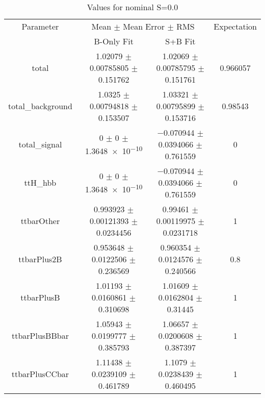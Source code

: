 \begin{table}
\centering
\caption{Values for nominal S=0.0}
\begin{tabular}{cccc}
\toprule
Parameter & \multicolumn{2}{c}{Mean $\pm$ Mean Error $\pm$ RMS} & Expectation\\
 & B-Only Fit & S+B Fit & \\
\midrule
total & \num{1.02079} $\pm$ \num{0.00785805} $\pm$ \num{0.151762} & \num{1.02069} $\pm$ \num{0.00785795} $\pm$ \num{0.151761} & \num{0.966057}\\
total\_background & \num{1.0325} $\pm$ \num{0.00794818} $\pm$ \num{0.153507} & \num{1.03321} $\pm$ \num{0.00795899} $\pm$ \num{0.153716} & \num{0.98543}\\
total\_signal & \num{0} $\pm$ \num{0} $\pm$ \num{1.3648e-10} & \num{-0.070944} $\pm$ \num{0.0394066} $\pm$ \num{0.761559} & \num{0}\\
ttH\_hbb & \num{0} $\pm$ \num{0} $\pm$ \num{1.3648e-10} & \num{-0.070944} $\pm$ \num{0.0394066} $\pm$ \num{0.761559} & \num{0}\\
ttbarOther & \num{0.993923} $\pm$ \num{0.00121393} $\pm$ \num{0.0234456} & \num{0.99461} $\pm$ \num{0.00119975} $\pm$ \num{0.0231718} & \num{1}\\
ttbarPlus2B & \num{0.953648} $\pm$ \num{0.0122506} $\pm$ \num{0.236569} & \num{0.960354} $\pm$ \num{0.0124576} $\pm$ \num{0.240566} & \num{0.8}\\
ttbarPlusB & \num{1.01193} $\pm$ \num{0.0160861} $\pm$ \num{0.310698} & \num{1.01609} $\pm$ \num{0.0162804} $\pm$ \num{0.31445} & \num{1}\\
ttbarPlusBBbar & \num{1.05943} $\pm$ \num{0.0199777} $\pm$ \num{0.385793} & \num{1.06657} $\pm$ \num{0.0200608} $\pm$ \num{0.387397} & \num{1}\\
ttbarPlusCCbar & \num{1.11438} $\pm$ \num{0.0239109} $\pm$ \num{0.461789} & \num{1.1079} $\pm$ \num{0.0238439} $\pm$ \num{0.460495} & \num{1}\\
\bottomrule
\end{tabular}
\end{table}
